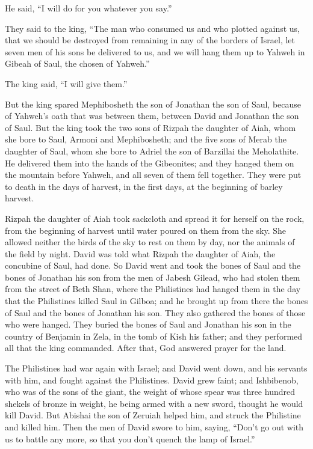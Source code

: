 He said, ``I will do for you whatever you say.''

 They said to the king, ``The man who consumed us and who
plotted against us, that we should be destroyed from remaining in any of
the borders of Israel,  let seven men of his sons be
delivered to us, and we will hang them up to Yahweh in Gibeah of Saul,
the chosen of Yahweh.''

The king said, ``I will give them.''

 But the king spared Mephibosheth the son of Jonathan the
son of Saul, because of Yahweh's oath that was between them, between
David and Jonathan the son of Saul.  But the king took the
two sons of Rizpah the daughter of Aiah, whom she bore to Saul, Armoni
and Mephibosheth; and the five sons of Merab the daughter of Saul, whom
she bore to Adriel the son of Barzillai the Meholathite.  He
delivered them into the hands of the Gibeonites; and they hanged them on
the mountain before Yahweh, and all seven of them fell together. They
were put to death in the days of harvest, in the first days, at the
beginning of barley harvest.

 Rizpah the daughter of Aiah took sackcloth and spread it
for herself on the rock, from the beginning of harvest until water
poured on them from the sky. She allowed neither the birds of the sky to
rest on them by day, nor the animals of the field by night.
 David was told what Rizpah the daughter of Aiah, the
concubine of Saul, had done.  So David went and took the
bones of Saul and the bones of Jonathan his son from the men of Jabesh
Gilead, who had stolen them from the street of Beth Shan, where the
Philistines had hanged them in the day that the Philistines killed Saul
in Gilboa;  and he brought up from there the bones of Saul
and the bones of Jonathan his son. They also gathered the bones of those
who were hanged.  They buried the bones of Saul and
Jonathan his son in the country of Benjamin in Zela, in the tomb of Kish
his father; and they performed all that the king commanded. After that,
God answered prayer for the land.

 The Philistines had war again with Israel; and David went
down, and his servants with him, and fought against the Philistines.
David grew faint;  and Ishbibenob, who was of the sons of
the giant, the weight of whose spear was three hundred shekels of bronze
in weight, he being armed with a new sword, thought he would kill David.
 But Abishai the son of Zeruiah helped him, and struck the
Philistine and killed him. Then the men of David swore to him, saying,
``Don't go out with us to battle any more, so that you don't quench the
lamp of Israel.''

